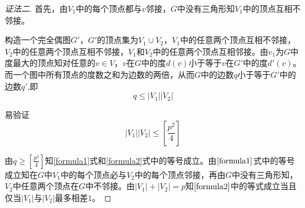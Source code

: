 \documentclass{article}
\begin{document}
\begin{CJK}{UTF8}{gbsn}
\begin{proof}[证法二]
  首先，由$V_1$中的每个顶点都与$v$邻接，$G$中没有三角形知$V_1$中的顶点互相不邻接。

  构造一个完全偶图$G'$，$G'$的顶点集为$V_1\cup V_2$，$V_1$中的任意两个顶点互相不邻接，$V_2$中的任意两个顶点互相不邻接，$V_1$和$V_2$中的任意两个顶点互相邻接。由$v_1$为$G$中度最大的顶点知对任意的$v\in V$，$v$在$G$中的度$d(v)$小于等于$v$在$G'$中的度$d'(v)$。而一个图中所有顶点的度数之和为边数的两倍，从而$G$中的边数$q$小于等于$G'$中的边数$q'$,即
  \begin{equation}\label{formula1}
    q \leq |V_1||V_2|
  \end{equation}

  易验证
  \begin{equation}\label{formula2}
    |V_1||V_2| \leq [\frac{p^2}{4}]
  \end{equation}

  由$q\geq [\frac{p^2}{4}]$知\eqref{formula1}式和\eqref{formula2}式中的等号成立。由$\eqref{formula1}$式中的等号成立知在$G$中$V_1$中的每个顶点必与$V_2$中的每个顶点邻接，再由$G$中没有三角形知，$V_2$中任意两个顶点在$G$中不邻接。由$|V_1|+|V_2|=p$知$\eqref{formula2}$中的等式成立当且仅当$|V_1|$与$|V_2|$最多相差$1$。
\end{proof}
\end{CJK}
\end{document}
